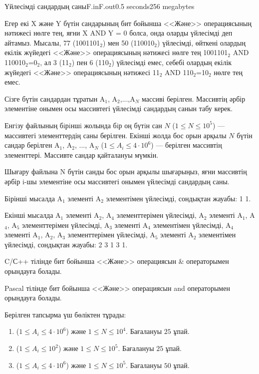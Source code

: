 \begin{problem}{Үйлесімді сандардың саны}{F.in}{F.out}{0.5 seconds}{256 megabytes}

Егер екі X және Y бүтін сандарының бит бойынша <<Және>> операциясының нәтижесі нөлге тең, яғни X AND Y = 0 болса, онда оларды үйлесімді деп айтамыз. Мысалы,  77 (1001101${}_{2}$) мен 50 (110010${}_{2}$) үйлесімді, өйткені олардың екілік жүйедегі <<Және>> операциясының нәтижесі нөлге тең 1001101${}_{2}$ AND 110010${}_{2}$=0${}_{2}$, ал  3 (11${}_{2}$) пен 6 (110${}_{2}$) үйлесімді емес, себебі олардың екілік жүйедегі <<Және>> операциясының нәтижесі 11${}_{2}$ AND 110${}_{2}$=10${}_{2}$ нөлге тең емес.


Сізге бүтін сандардан тұратын A${}_{1}$, A${}_{2}$,...,A${}_{N}$ массиві берілген. Массивтің әрбір элементіне онымен осы массивтегі үйлесімді сандардың санын табу керек.


\InputFile
Енгiзу файлының бiрiншi жолында бiр оң бүтiн сан $N$ ($1 \le N \le 10^5$) --- массивтегі элементтердің саны берілген. Екінші жолда бос орын арқылы $N$ бүтін сандар берілген A${}_{1}$, A${}_{2}$, ..., A${}_{N}$ ($1 \le A_i \le 4 \cdot 10^6$) --- берілген массивтің элементтері. Массивте сандар қайталануы мүмкін.

\OutputFile
Шығару файлына N бүтін санды бос орын арқылы шығарыңыз, яғни массивтің әрбір i-шы элементіне осы массивтегі онымен үйлесімді сандардың саны.

\Examples

\begin{example}
%
%
%
\end{example}

\Note
Бірінші мысалда A${}_{1}$ элементі A${}_{2}$ элементімен үйлесімді, сондықтан жауабы: 1 1. 

Екінші мысалда A${}_{1}$ элементі A${}_{2}$, A${}_{4}$ элементтерімен үйлесімді, A${}_{2}$ элементі A${}_{1}$, A${}_{4}$, A${}_{5}$ элементтерімен үйлесімді, A${}_{3}$ элементі A${}_{4}$ элементімен үйлесімді, A${}_{4}$ элементі A${}_{1}$, A${}_{2}$, A${}_{3}$ элементтерімен үйлесімді, A${}_{5}$ элементі A${}_{2}$ элементімен үйлесімді, сондықтан жауабы: 2 3 1 3 1.

C/С++ тілінде бит бойынша <<Және>> операциясын \& операторымен орындауға болады.

Pascal тілінде бит бойынша <<Және>> операциясын and операторымен орындауға болады.

\Scoring
Берілген тапсырма үш бөліктен тұрады:
\begin{enumerate}
\item ($1 \le A_i \le 4 \cdot 10^6$) және $1 \le N \le 10^4$. Бағалануы $25$ ұпай.
\item ($1 \le A_i \le 10^2$) және $1 \le N \le 10^5$. Бағалануы $25$ ұпай.
\item ($1 \le A_i \le 4 \cdot 10^6$) және $1 \le N \le 10^5$. Бағалануы $50$ ұпай.
\end{enumerate}

\end{problem}
